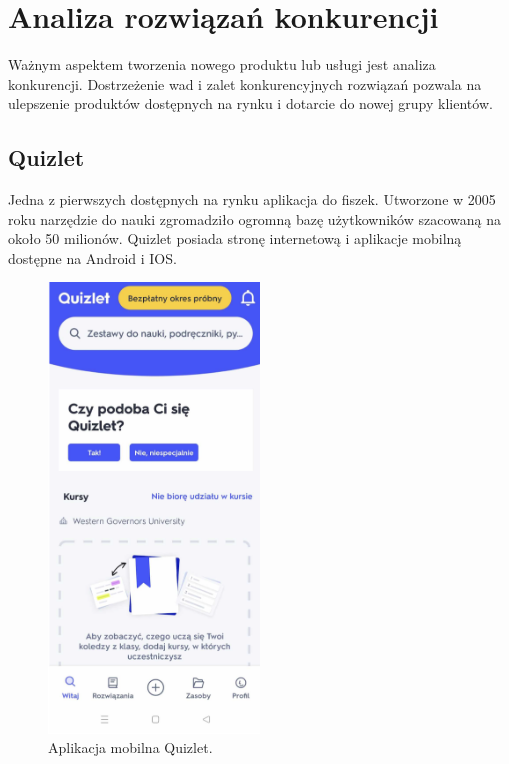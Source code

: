 \section{Analiza rozwiązań konkurencji}

Ważnym aspektem tworzenia nowego produktu lub usługi jest analiza konkurencji. Dostrzeżenie wad i zalet konkurencyjnych rozwiązań pozwala na ulepszenie produktów dostępnych na rynku i dotarcie do nowej grupy klientów.

\subsection{Quizlet}


Jedna z pierwszych dostępnych na rynku aplikacja do fiszek. Utworzone w 2005 roku narzędzie do nauki zgromadziło ogromną bazę użytkowników szacowaną na około 50 milionów. Quizlet posiada stronę internetową i aplikacje mobilną dostępne na Android i IOS.

\begin{figure}[H]
    \centering
    \includegraphics[width=0.5\textwidth]{chapters/chapter_3/quizlet.png}
    \caption{Aplikacja mobilna Quizlet.}
    \label{img:quizlet}
\end{figure}

